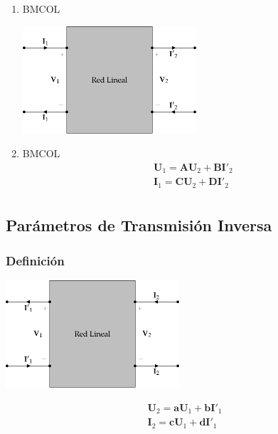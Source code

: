 \begin{enumerate}
\item \hfill{}\textsc{BMCOL}
\label{sec:orga42aeb3}

\includegraphics[height=4cm]{../figs/cuadripolo_transmision.pdf}


\item \hfill{}\textsc{BMCOL}
\label{sec:orgb82d084}
\renewcommand{\arraystretch}{1}
\[
\begin{array}{l}
  \mathbf{U}_1 = \mathbf{A} \mathbf{U}_2 + \mathbf{B}\mathbf{I'}_2\\
  \mathbf{I}_1 = \mathbf{C} \mathbf{U}_2 + \mathbf{D} \mathbf{I'}_2\\
\end{array}
\]
\end{enumerate}


\subsection{Parámetros de Transmisión Inversa}
\label{sec:orgd62a71b}

\subsubsection{Definición}
\label{sec:org52b179c}

\includegraphics[height=4cm]{../figs/cuadripolo_transmision_inversa.pdf}


\[
\begin{array}{l}
  \mathbf{U}_2 = \mathbf{a} \mathbf{U}_1 + \mathbf{b}\mathbf{I'}_1\\
  \mathbf{I}_2 = \mathbf{c} \mathbf{U}_1 + \mathbf{d} \mathbf{I'}_1\\
\end{array}
\]


